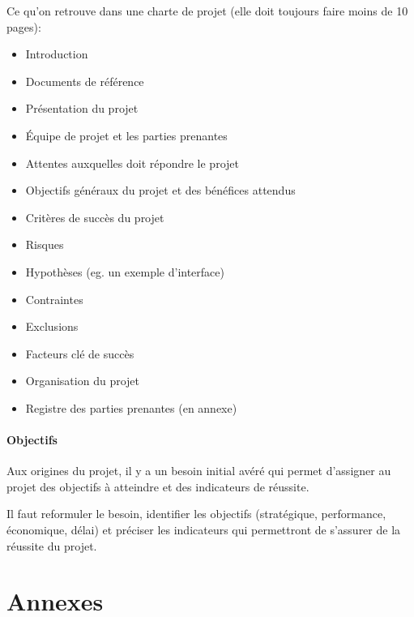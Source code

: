 \documentclass[10pt,a4paper,french]{article}
\begin{document}
Ce qu'on retrouve dans une charte de projet (elle doit toujours faire moins de 10 pages):
\begin{itemize}
\item Introduction
\item Documents de référence
\item Présentation du projet
\item Équipe de projet et les parties prenantes
\item Attentes auxquelles doit répondre le projet
\item Objectifs généraux du projet et des bénéfices attendus
\item Critères de succès du projet
\item Risques
\item Hypothèses (eg. un exemple d'interface)
\item Contraintes
\item Exclusions
\item Facteurs clé de succès
\item Organisation du projet
\item Registre des parties prenantes (en annexe)
\end{itemize}

\subsection{Objectifs}

\begin{cquote}{}
Aux origines du projet, il y a un besoin initial avéré qui permet d'assigner au projet des objectifs à atteindre et des indicateurs de réussite.
\end{cquote}

Il faut reformuler le besoin, identifier les objectifs (stratégique, performance, économique, délai) et préciser les indicateurs qui permettront de s'assurer de la réussite du projet.

\appendix %
\part{Annexes}
\printglossaries
\printindex
\end{document}
